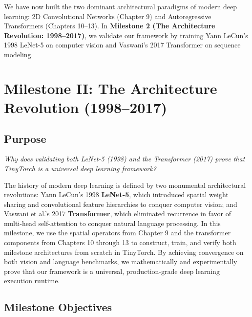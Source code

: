 \documentclass[
  letterpaper,
]{scrbook}
\begin{document}
We have now built the two dominant architectural paradigms of modern
deep learning: 2D Convolutional Networks (Chapter 9) and Autoregressive
Transformers (Chapters 10--13). In \textbf{Milestone 2 (The Architecture
Revolution: 1998--2017)}, we validate our framework by training Yann
LeCun's 1998 LeNet-5 on computer vision and Vaswani's 2017 Transformer
on sequence modeling.

\chapter*{Milestone II: The Architecture Revolution
(1998--2017)}\label{milestone-ii-the-architecture-revolution-19982017}


\section*{Purpose}\label{purpose-15}


\emph{Why does validating both LeNet-5 (1998) and the Transformer (2017)
prove that TinyTorch is a universal deep learning framework?}

The history of modern deep learning is defined by two monumental
architectural revolutions: Yann LeCun's 1998 \textbf{LeNet-5}, which
introduced spatial weight sharing and convolutional feature hierarchies
to conquer computer vision; and Vaswani et al.'s 2017
\textbf{Transformer}, which eliminated recurrence in favor of multi-head
self-attention to conquer natural language processing. In this
milestone, we use the spatial operators from Chapter 9 and the
transformer components from Chapters 10 through 13 to construct, train,
and verify both milestone architectures from scratch in TinyTorch. By
achieving convergence on both vision and language benchmarks, we
mathematically and experimentally prove that our framework is a
universal, production-grade deep learning execution runtime.

\section*{Milestone Objectives}\label{milestone-objectives-1}
\end{document}
